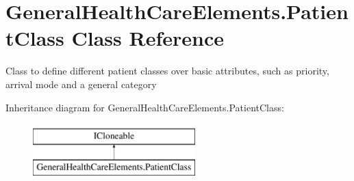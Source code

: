 \hypertarget{class_general_health_care_elements_1_1_patient_class}{}\section{General\+Health\+Care\+Elements.\+Patient\+Class Class Reference}
\label{class_general_health_care_elements_1_1_patient_class}


Class to define different patient classes over basic attributes, such as priority, arrival mode and a general category  


Inheritance diagram for General\+Health\+Care\+Elements.\+Patient\+Class\+:\begin{figure}[H]
\begin{center}
\leavevmode
\includegraphics[height=2.000000cm]{class_general_health_care_elements_1_1_patient_class}
\end{center}
\end{figure}
